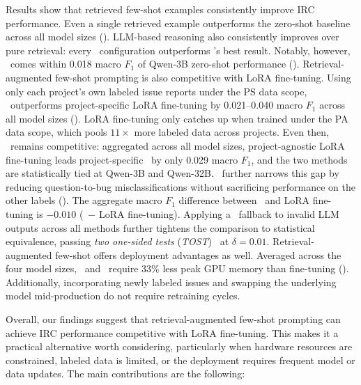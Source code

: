 Results show that retrieved few-shot examples consistently improve IRC performance. Even a single retrieved example outperforms the zero-shot baseline across all model sizes (). LLM-based reasoning also consistently improves over pure retrieval: every \ragtag\ configuration outperforms \votag's best result. Notably, however, \votag\ comes within 0.018 macro $F_1$ of Qwen-3B zero-shot performance ().
Retrieval-augmented few-shot prompting is also competitive with LoRA fine-tuning. Using only each project's own labeled issue reports under the PS data scope, \ragtag\ outperforms project-specific LoRA fine-tuning by 0.021--0.040 macro $F_1$ across all model sizes (). LoRA fine-tuning only catches up when trained under the PA data scope, which pools $11\times$ more labeled data across projects. Even then, \ragtag\ remains competitive: aggregated across all model sizes, project-agnostic LoRA fine-tuning leads project-specific \ragtag\ by only 0.029 macro $F_1$, and the two methods are statistically tied at Qwen-3B and Qwen-32B. \bragtag\ further narrows this gap by reducing question-to-bug misclassifications without sacrificing performance on the other labels (). The aggregate macro $F_1$ difference between \bragtag\ and LoRA fine-tuning is $-0.010$ (\bragtag\ $-$ LoRA fine-tuning). Applying a \votag\ fallback to invalid LLM outputs across all methods further tightens the comparison to statistical equivalence, passing \emph{two one-sided tests} (\emph{TOST})~\cite{lakens2017equivalence} at $\delta{=}0.01$.
Retrieval-augmented few-shot offers deployment advantages as well. Averaged across the four model sizes, \ragtag\ and \bragtag\ require 33\% less peak GPU memory than fine-tuning (). Additionally, incorporating newly labeled issues and swapping the underlying model mid-production do not require retraining cycles.

Overall, our findings suggest that retrieval-augmented few-shot prompting can achieve IRC performance competitive with LoRA fine-tuning. This makes it a practical alternative worth considering, particularly when hardware resources are constrained, labeled data is limited, or the deployment requires frequent model or data updates.
The main contributions are the following:

